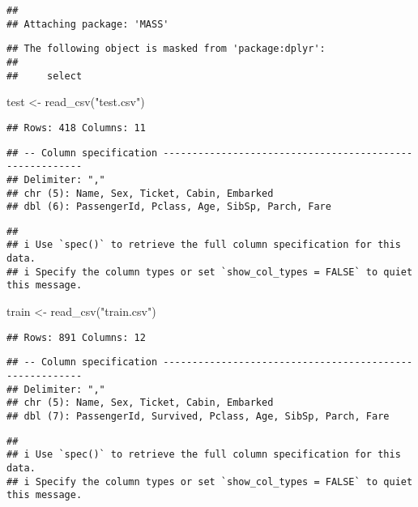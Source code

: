 \documentclass[
]{article}
\newenvironment{Shaded}{\begin{snugshade}}{\end{snugshade}}
\newcommand{\FunctionTok}[1]{\textcolor[rgb]{0.00,0.00,0.00}{#1}}
\newcommand{\NormalTok}[1]{#1}
\newcommand{\OtherTok}[1]{\textcolor[rgb]{0.56,0.35,0.01}{#1}}
\newcommand{\StringTok}[1]{\textcolor[rgb]{0.31,0.60,0.02}{#1}}
\begin{document}
\begin{verbatim}
## 
## Attaching package: 'MASS'
\end{verbatim}

\begin{verbatim}
## The following object is masked from 'package:dplyr':
## 
##     select
\end{verbatim}

\begin{Shaded}
\begin{Highlighting}[]
\NormalTok{test }\OtherTok{\textless{}{-}} \FunctionTok{read\_csv}\NormalTok{(}\StringTok{"test.csv"}\NormalTok{)}
\end{Highlighting}
\end{Shaded}

\begin{verbatim}
## Rows: 418 Columns: 11
\end{verbatim}

\begin{verbatim}
## -- Column specification --------------------------------------------------------
## Delimiter: ","
## chr (5): Name, Sex, Ticket, Cabin, Embarked
## dbl (6): PassengerId, Pclass, Age, SibSp, Parch, Fare
\end{verbatim}

\begin{verbatim}
## 
## i Use `spec()` to retrieve the full column specification for this data.
## i Specify the column types or set `show_col_types = FALSE` to quiet this message.
\end{verbatim}

\begin{Shaded}
\begin{Highlighting}[]
\NormalTok{train }\OtherTok{\textless{}{-}} \FunctionTok{read\_csv}\NormalTok{(}\StringTok{"train.csv"}\NormalTok{)}
\end{Highlighting}
\end{Shaded}

\begin{verbatim}
## Rows: 891 Columns: 12
\end{verbatim}

\begin{verbatim}
## -- Column specification --------------------------------------------------------
## Delimiter: ","
## chr (5): Name, Sex, Ticket, Cabin, Embarked
## dbl (7): PassengerId, Survived, Pclass, Age, SibSp, Parch, Fare
\end{verbatim}

\begin{verbatim}
## 
## i Use `spec()` to retrieve the full column specification for this data.
## i Specify the column types or set `show_col_types = FALSE` to quiet this message.
\end{verbatim}
\end{document}
